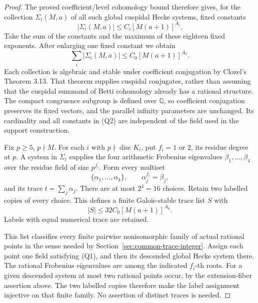 \begin{proof}
The proved coefficient/level cohomology bound therefore
gives, for the collection \(\Sigma_i(M,a)\) of all such
global cuspidal Hecke systems, fixed constants
\[
 |\Sigma_i(M,a)|\le C_i[M(a+1)]^{A_i}.
\]
Take the sum of the constants and the maximum of these
eighteen fixed exponents.
After enlarging one fixed constant we obtain
\[
                \sum_i|\Sigma_i(M,a)|
                       \le C_0[M(a+1)]^{A_0}.
 \tag{Q2}
\]
Each collection is algebraic and stable under coefficient
conjugation by Clozel's Theorem 3.13.
That theorem supplies cuspidal conjugates, rather than
assuming that the cuspidal summand of Betti cohomology
already has a rational structure.
The compact congruence subgroup is defined over
\(\mathbb Q\), so coefficient conjugation preserves
its fixed vectors, and the parallel infinity parameters
are unchanged.
Its cardinality and all constants in (Q2) are independent
of the field used in the support construction.

Fix \(p\ge5\), \(p\nmid M\).
For each \(i\) with \(p\nmid\operatorname{disc}K_i\), put
\(f_i=1\) or \(2\), its residue degree at \(p\).
A system in \(\Sigma_i\) supplies the four arithmetic
Frobenius eigenvalues \(\beta_1,\ldots,\beta_4\) over
the residue field of size \(p^{f_i}\).
Form every multiset
\[
                 \{\alpha_1,\ldots,\alpha_4\},
                     \qquad \alpha_j^{f_i}=\beta_j,
\]
and its trace \(t=\sum_j\alpha_j\).
There are at most \(2^4=16\) choices.
Retain two labelled copies of every choice.
This defines a finite Galois-stable trace list \(S\) with
\[
                       |S|\le32C_0[M(a+1)]^{A_0}.
 \tag{Q3}
\]
Labels with equal numerical trace are retained.

This list classifies every finite pairwise nonisomorphic
family of actual rational points in the sense needed by
Section~\ref{sec:common-trace-integer}.
Assign each point one field satisfying (Q1), and then
its descended global Hecke system there.
The rational Frobenius eigenvalues are among the indicated
\(f_i\)-th roots.
For a given descended system at most two rational points
occur, by the extension-fiber assertion above.
The two labelled copies therefore make the label
assignment injective on that finite family.
No assertion of distinct traces is needed.


\end{proof}
